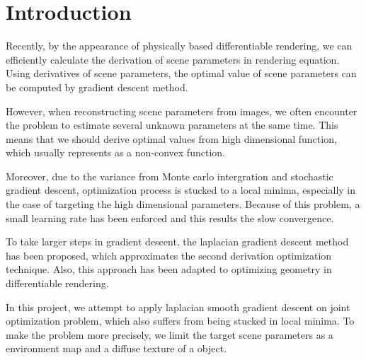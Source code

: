 \section*{Introduction}\label{ch:ch1label}

Recently, by the appearance of physically based differentiable rendering, we can efficiently calculate the derivation of scene parameters in rendering equation. Using derivatives of scene parameters, the optimal value of scene parameters can be computed by gradient descent method. 

However, when reconstructing scene parameters from images, we often encounter the problem to estimate several unknown parameters at the same time. This means that we should derive optimal values from high dimensional function, which usually represents as a non-convex function.

Moreover, due to the variance from Monte carlo intergration and stochastic gradient descent, optimization process is stucked to a local minima, especially in the case of targeting the high dimensional parameters. Because of this problem, a small learning rate has been enforced and this results the slow convergence.

To take larger steps in gradient descent, the laplacian gradient descent method has been proposed, which approximates the second derivation optimization technique\cite{osher2018laplacian}.
Also, this approach has been adapted to optimizing geometry in differentiable rendering\cite{Nicolet2021Large}.

In this project, we attempt to apply laplacian smooth gradient descent on joint optimization problem, which also suffers from being stucked in local minima. To make the problem more precisely, we limit the target scene parameters as a environment map and a diffuse texture of a object.
